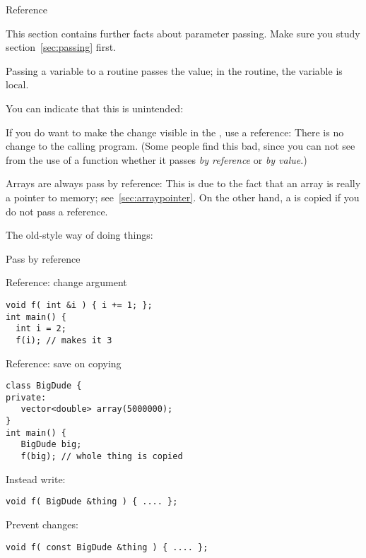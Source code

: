 
 {Reference}
\label{sec:reference}

This section contains further facts about parameter passing. Make sure
you study section~\ref{sec:passing} first.

Passing a variable to a routine passes the value; in the routine, the
variable is local.


You can indicate that this is unintended:


If you do want to make the change visible in the
%
, use a reference:
%
%
There is no change to the calling program. (Some people find this bad,
since you can not see from the use of a function whether it passes
%
\emph{by reference}
%
or \emph{by value}.)

Arrays are always pass by reference:
%
%
This is due to the fact that an array is really a pointer to memory;
see~\ref{sec:arraypointer}. On the other hand, a  is
copied if you do not pass a reference.

The old-style way of doing things:
%

 {Pass by reference}

\begin{block}{Reference: change argument}
\label{sl:refarg-change}
\begin{verbatim}
void f( int &i ) { i += 1; };
int main() {
  int i = 2;
  f(i); // makes it 3
\end{verbatim}
\end{block}

\begin{block}{Reference: save on copying}
\label{sl:refarg-nocopy}
\begin{verbatim}
class BigDude {
private:
   vector<double> array(5000000);
}
int main() {
   BigDude big;
   f(big); // whole thing is copied
\end{verbatim}
Instead write:
\begin{verbatim}
void f( BigDude &thing ) { .... };
\end{verbatim}
Prevent changes:
\begin{verbatim}
void f( const BigDude &thing ) { .... };
\end{verbatim}
\end{block}

